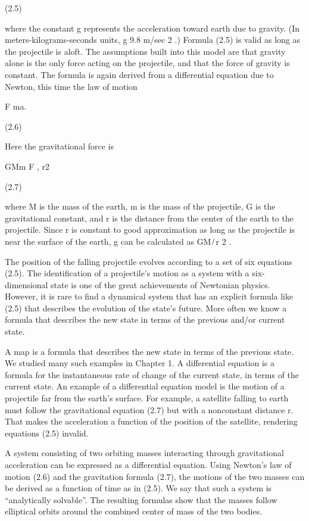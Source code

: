 \documentclass[12pt]{article}
\begin{document}
(2.5)

where the constant g represents the acceleration toward earth due to gravity. (In meters-kilograms-seconds units, g  9.8 m/sec 2 .) 
Formula (2.5) is valid as long as the projectile is aloft. The assumptions built into this model are that gravity alone is the only 
force acting on the projectile, and that the force of gravity is constant. The formula is again derived from a differential equation 
due to Newton, this time the law of motion

F  ma.

(2.6)

Here the gravitational force is

GMm F , r2 

(2.7)

where M is the mass of the earth, m is the mass of the projectile, G is the gravitational constant, and r is the distance from the 
center of the earth to the projectile. Since r is constant to good approximation as long as the projectile is near the surface of the 
earth, g can be calculated 
as GM ̸ r 2 .

The position of the falling projectile evolves according to a set of six equations (2.5). The identiﬁcation of a projectile’s motion 
as a system with a six-dimensional state is one of the great achievements of Newtonian physics. However, it is rare to ﬁnd a 
dynamical system that has an explicit formula like (2.5) that describes the evolution of the state’s future. More often we know a 
formula that describes the new state in terms of the previous and/or current state.

A map is a formula that describes the new state in terms of the previous state. We studied many such examples in Chapter 1. A 
differential equation is a formula for the instantaneous rate of change of the current state, in terms of the current state. An 
example of a differential equation model is the motion of a projectile far from the earth’s surface. For example, a satellite falling 
to earth must follow the gravitational equation (2.7) but with a nonconstant distance r. That makes the acceleration a function of 
the position of the satellite, rendering equations (2.5) invalid.

A system consisting of two orbiting masses interacting through gravitational acceleration can be expressed as a differential 
equation. Using Newton’s law of motion (2.6) and the gravitation formula (2.7), the motions of the two masses can be derived as a 
function of time as in (2.5). We say that such a system is “analytically solvable”. The resulting formulas show that the masses 
follow elliptical orbits around the combined center of mass of the two bodies.
\end{document}
